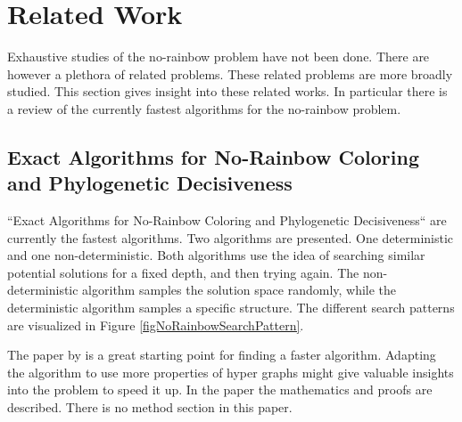 \documentclass[msc,lith,english]{liuthesis}
\begin{document}
\chapter{Related Work}
Exhaustive studies of the no-rainbow problem have not been done. There are however a plethora of related problems.
These related problems are more broadly studied. This section gives insight
into these related works. In particular there is a review of the currently
fastest algorithms for the no-rainbow problem.

\section{Exact Algorithms for No-Rainbow Coloring and Phylogenetic Decisiveness}
``Exact Algorithms for No-Rainbow Coloring and Phylogenetic Decisiveness`` \cite{sourceNoRainbow}
are currently the fastest algorithms.
Two algorithms are presented. One deterministic and one non-deterministic. Both
algorithms use the idea of searching similar potential solutions for a fixed
depth, and then trying again. The non-deterministic algorithm samples the
solution space randomly, while the deterministic algorithm samples a specific
structure. The different search patterns are visualized in Figure \ref{figNoRainbowSearchPattern}. 

The paper by \citeauthor{sourceNoRainbow} \cite{sourceNoRainbow} is a great starting point for finding a faster algorithm.
Adapting the algorithm to use more properties of hyper graphs might give valuable insights into the problem to speed it up.
In the paper the mathematics and proofs are described. There is no method section in this paper.
\end{document}
